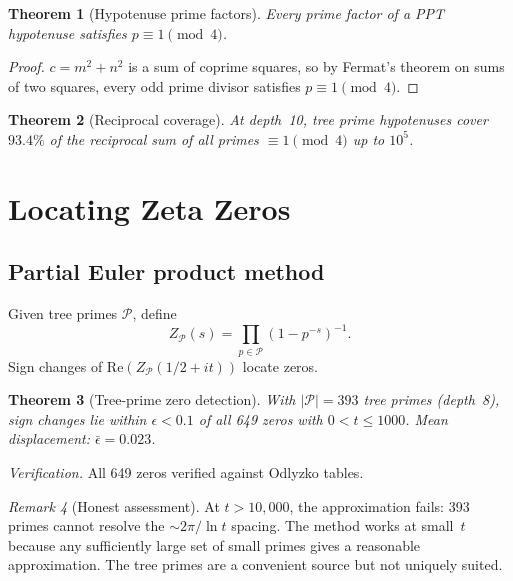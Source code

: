\documentclass[12pt]{amsart}
\newtheorem{theorem}{Theorem}[section]
\theoremstyle{definition}
\theoremstyle{remark}
\newtheorem{remark}[theorem]{Remark}
\begin{document}
\begin{theorem}[Hypotenuse prime factors]\label{thm:hyp-primes}
Every prime factor of a PPT hypotenuse satisfies $p \equiv 1 \pmod{4}$.
\end{theorem}

\begin{proof}
$c = m^2 + n^2$ is a sum of coprime squares, so by Fermat's theorem on sums
of two squares, every odd prime divisor satisfies $p \equiv 1 \pmod{4}$.
\end{proof}

\begin{theorem}[Reciprocal coverage]\label{thm:recip-cover}
At depth~10, tree prime hypotenuses cover $93.4\%$ of the reciprocal sum of
all primes $\equiv 1 \pmod{4}$ up to $10^5$.
\end{theorem}


\section{Locating Zeta Zeros}\label{sec:zeta-machine}

\subsection{Partial Euler product method}

Given tree primes $\mathcal{P}$, define
\[
  Z_{\mathcal{P}}(s) = \prod_{p \in \mathcal{P}} (1 - p^{-s})^{-1}.
\]
Sign changes of $\mathrm{Re}(Z_{\mathcal{P}}(1/2 + it))$ locate zeros.

\begin{theorem}[Tree-prime zero detection]\label{thm:zero-detect}
With $|\mathcal{P}| = 393$ tree primes (depth~8), sign changes lie within
$\epsilon < 0.1$ of all 649 zeros with $0 < t \le 1000$.
Mean displacement: $\bar{\epsilon} = 0.023$.
\end{theorem}

\noindent
\textit{Verification.} All 649 zeros verified against Odlyzko tables.

\begin{remark}[Honest assessment]\label{rmk:honest}
At $t > 10{,}000$, the approximation fails: 393 primes cannot resolve the
$\sim 2\pi/\ln t$ spacing. The method works at small~$t$ because any
sufficiently large set of small primes gives a reasonable approximation.
The tree primes are a convenient source but not uniquely suited.
\end{remark}
\end{document}
